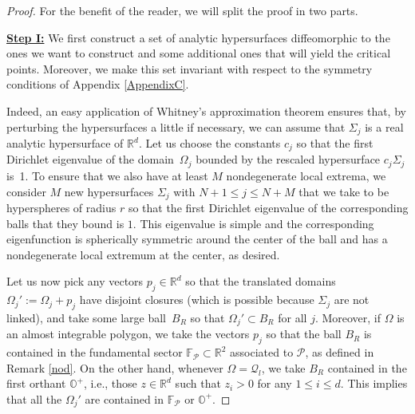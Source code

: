 \documentclass{amsart}
\theoremstyle{definition}
\theoremstyle{remark}
\newcommand{\Si}{\Sigma}
\newcommand{\Om}{\Omega}
\def\RR{\mathbb{R}}
\renewcommand\leq\leqslant
\numberwithin{equation}{section}
\theoremstyle{definition}
\theoremstyle{remark}
\def\RR{\mathbb{R}}
\begin{document}
\begin{proof}
For the benefit of the reader, we will split the proof in two parts. 

\textbf{	\underline{Step I:}}
	We first construct a set of analytic hypersurfaces diffeomorphic to the ones we want to construct and some additional ones that will yield the critical points. Moreover, we make this set invariant with respect to the symmetry conditions of Appendix \ref{AppendixC}.
    
    Indeed, an easy application of Whitney's approximation theorem ensures that, by perturbing the hypersurfaces a little if necessary, we can assume that $\Sigma_j$ is a real analytic hypersurface of $\mathbb{R}^d$.  Let us choose the constants $c_j$ so that the first Dirichlet eigenvalue of the domain~$\Om_j$ bounded by the rescaled hypersurface $c_j\Si_j$ is~1. 	To ensure that we also have at least $M$ nondegenerate local extrema, we consider $M$ new hypersurfaces $\Si_j$ with $N+1\leq j\leq N+M$ that we take to be hyperspheres of radius $r$ so that the first Dirichlet eigenvalue of the corresponding balls that they bound is $1$. This eigenvalue is simple and the corresponding eigenfunction is spherically symmetric around the center of the ball and has a nondegenerate local extremum at the center, as desired.
	
	Let us now pick any vectors $p_j\in\RR^d$ so that the translated domains $\Om_j':=\Om_j+p_j$ have disjoint closures (which is possible because $\Sigma_j$ are not linked), and take some large ball~$B_R$ so that $\Om_j'\subset B_R$ for all $j$. Moreover, if $\Omega$ is an almost integrable polygon, we take the vectors $p_j$ so that the ball $B_R$ is contained in the fundamental sector $\mathbb{F}_\mathcal{P}\subset\mathbb{R}^2$ associated to $\mathcal{P}$, as defined in Remark \ref{nod}. On the other hand, whenever $\Omega=\mathcal{Q}_l$, we take $B_R$ contained in the first orthant $\mathbb{O}^+$, i.e., those $z\in\mathbb{R}^d$ such that $z_i>0$ for any $1\leq i\leq d$. This implies that all the $\Om_j'$ are contained in $\mathbb{F}_\mathcal{P}$ or $\mathbb{O}^+$.


\end{proof}
\end{document}
